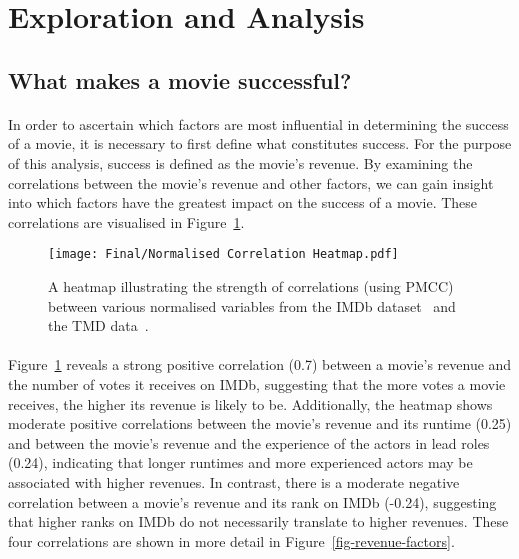 \newpage
\section{Exploration and Analysis}
    \subsection{What makes a movie successful?}
        \begin{multicols}{2}
            \paragraph{}
                In order to ascertain which factors are most influential in determining the
                    success of a movie, it is necessary to first define what constitutes success.
                For the purpose of this analysis, success is defined as the movie's revenue.
                By examining the correlations between the movie's revenue and other factors, we
                    can gain insight into which factors have the greatest impact on the success of
                    a movie.
                These correlations are visualised in Figure~\ref{fig-heatmap}.

                \begin{figure}[H]
                    \centering
                    \texttt{[image: Final/Normalised Correlation Heatmap.pdf]}
                    \caption{
                        A heatmap illustrating the strength of correlations (using PMCC) between various normalised
                        variables from the IMDb dataset~\cite{data:IMDb} and the TMD
                        data~\cite{data:TMD}.
                    }\label{fig-heatmap}
                \end{figure}

            \paragraph{}
                Figure~\ref{fig-heatmap} reveals a strong positive correlation (0.7) between a
                    movie's revenue and the number of votes it receives on IMDb, suggesting that
                    the more votes a movie receives, the higher its revenue is likely to be.
                Additionally, the heatmap shows moderate positive correlations between the
                    movie's revenue and its runtime (0.25) and between the movie's revenue and the
                    experience of the actors in lead roles (0.24), indicating that longer runtimes
                    and more experienced actors may be associated with higher revenues.
                In contrast, there is a moderate negative correlation between a movie's revenue
                    and its rank on IMDb (-0.24), suggesting that higher ranks on IMDb do not
                    necessarily translate to higher revenues.
                These four correlations are shown in more detail in
                    Figure~\ref{fig-revenue-factors}.


\end{multicols}
